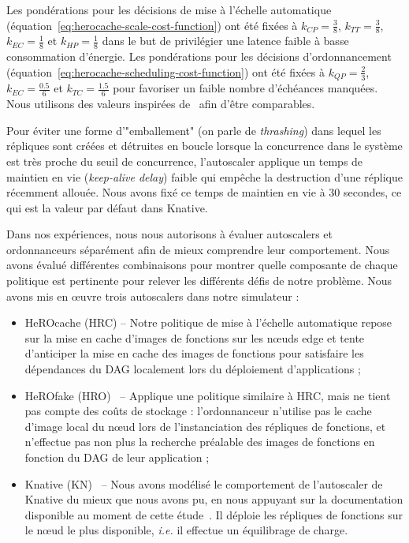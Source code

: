 Les pondérations pour les décisions de mise à l'échelle automatique (équation~\ref{eq:herocache-scale-cost-function}) ont été fixées à $k_{CP} = \frac{3}{8}$, $k_{TT} = \frac{3}{8}$, $k_{EC} = \frac{1}{8}$ et $k_{HP} = \frac{1}{8}$ dans le but de privilégier une latence faible à basse consommation d'énergie. Les pondérations pour les décisions d'ordonnancement (équation~\ref{eq:herocache-scheduling-cost-function}) ont été fixées à $k_{QP} = \frac{2}{3}$, $k_{EC} = \frac{0.5}{6}$ et $k_{TC} = \frac{1.5}{6}$ pour favoriser un faible nombre d'échéances manquées. Nous utilisons des valeurs inspirées de~\cite{herofake} afin d'être comparables.

Pour éviter une forme d'"emballement" (on parle de \textit{thrashing}) dans lequel les répliques sont créées et détruites en boucle lorsque la concurrence dans le système est très proche du seuil de concurrence, l'autoscaler applique un temps de maintien en vie (\textit{keep-alive delay}) faible qui empêche la destruction d'une réplique récemment allouée. Nous avons fixé ce temps de maintien en vie à 30 secondes, ce qui est la valeur par défaut dans Knative.

Dans nos expériences, nous nous autorisons à évaluer autoscalers et ordonnanceurs séparément afin de mieux comprendre leur comportement. Nous avons évalué différentes combinaisons pour montrer quelle composante de chaque politique est pertinente pour relever les différents défis de notre problème. Nous avons mis en œuvre trois autoscalers dans notre simulateur :

\begin{itemize}
    \item HeROcache (HRC) -- Notre politique de mise à l'échelle automatique repose sur la mise en cache d'images de fonctions sur les nœuds edge et tente d'anticiper la mise en cache des images de fonctions pour satisfaire les dépendances du DAG localement lors du déploiement d'applications ;
    \item HeROfake (HRO)~\cite{herofake} -- Applique une politique similaire à HRC, mais ne tient pas compte des coûts de stockage : l'ordonnanceur n'utilise pas le cache d'image local du nœud lors de l'instanciation des répliques de fonctions, et n'effectue pas non plus la recherche préalable des images de fonctions en fonction du DAG de leur application ;
    \item Knative (KN)~\cite{sureshENSUREEfficientScheduling2020} -- Nous avons modélisé le comportement de l'autoscaler de Knative du mieux que nous avons pu, en nous appuyant sur la documentation disponible au moment de cette étude~\cite{knative-autoscaling}. Il déploie les répliques de fonctions sur le nœud le plus disponible, \textit{i.e.} il effectue un équilibrage de charge.
\end{itemize}

